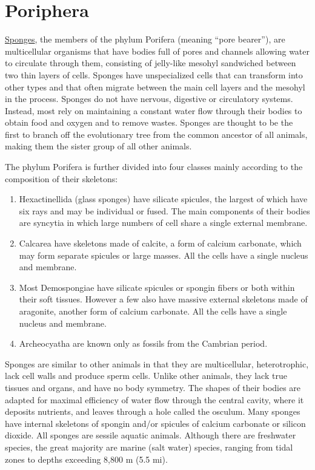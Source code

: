\section{Poriphera}\label{poriphera}

\href{https://en.wikipedia.org/wiki/Sponge}{Sponges}, the members of the
phylum Porifera (meaning ``pore bearer''), are multicellular organisms
that have bodies full of pores and channels allowing water to circulate
through them, consisting of jelly-like mesohyl sandwiched between two
thin layers of cells. Sponges have unspecialized cells that can
transform into other types and that often migrate between the main cell
layers and the mesohyl in the process. Sponges do not have nervous,
digestive or circulatory systems. Instead, most rely on maintaining a
constant water flow through their bodies to obtain food and oxygen and
to remove wastes. Sponges are thought to be the first to branch off the
evolutionary tree from the common ancestor of all animals, making them
the sister group of all other animals.

The phylum Porifera is further divided into four classes mainly
according to the composition of their skeletons:

\begin{enumerate}
\def\labelenumi{\arabic{enumi}.}
\tightlist
\item
  Hexactinellida (glass sponges) have silicate spicules, the largest of
  which have six rays and may be individual or fused. The main
  components of their bodies are syncytia in which large numbers of cell
  share a single external membrane.
\item
  Calcarea have skeletons made of calcite, a form of calcium carbonate,
  which may form separate spicules or large masses. All the cells have a
  single nucleus and membrane.
\item
  Most Demospongiae have silicate spicules or spongin fibers or both
  within their soft tissues. However a few also have massive external
  skeletons made of aragonite, another form of calcium carbonate. All
  the cells have a single nucleus and membrane.
\item
  Archeocyatha are known only as fossils from the Cambrian period.
\end{enumerate}

Sponges are similar to other animals in that they are multicellular,
heterotrophic, lack cell walls and produce sperm cells. Unlike other
animals, they lack true tissues and organs, and have no body symmetry.
The shapes of their bodies are adapted for maximal efficiency of water
flow through the central cavity, where it deposits nutrients, and leaves
through a hole called the osculum. Many sponges have internal skeletons
of spongin and/or spicules of calcium carbonate or silicon dioxide. All
sponges are sessile aquatic animals. Although there are freshwater
species, the great majority are marine (salt water) species, ranging
from tidal zones to depths exceeding 8,800 m (5.5 mi).

